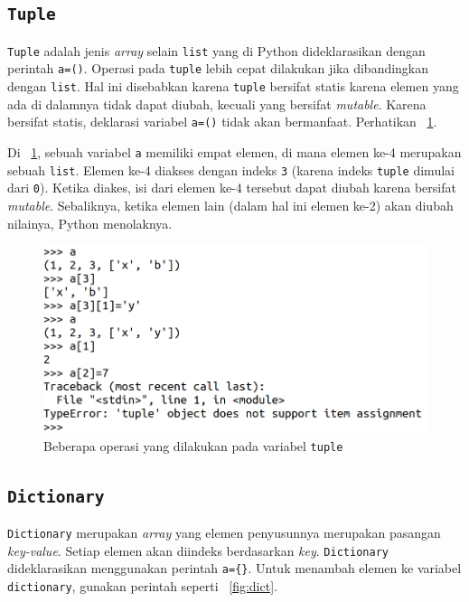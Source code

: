 \subsection{\texttt{Tuple}}
\texttt{Tuple} adalah jenis \textit{array} selain \texttt{list} yang di Python dideklarasikan dengan perintah \texttt{a=()}. Operasi pada \texttt{tuple} lebih cepat dilakukan jika dibandingkan dengan \texttt{list}. Hal ini disebabkan karena \texttt{tuple} bersifat statis karena elemen yang ada di dalamnya tidak dapat diubah, kecuali yang bersifat \textit{mutable}. Karena bersifat statis, deklarasi variabel \texttt{a=()} tidak akan bermanfaat. Perhatikan \figurename~\ref{fig:tuple}.

Di \figurename~\ref{fig:tuple}, sebuah variabel \texttt{a} memiliki empat elemen, di mana elemen ke-4 merupakan sebuah \texttt{list}. Elemen ke-4 diakses dengan indeks \texttt{3} (karena indeks \texttt{tuple} dimulai dari \texttt{0}). Ketika diakes, isi dari elemen ke-4 tersebut dapat diubah karena bersifat \textit{mutable}. Sebaliknya, ketika elemen lain (dalam hal ini elemen ke-2) akan diubah nilainya, Python menolaknya. 

\begin{figure}[h!]
  \begin{center}
    \includegraphics{pics/tuple.png}
    \caption{Beberapa operasi yang dilakukan pada variabel \texttt{tuple}}
    \label{fig:tuple}
  \end{center}
\end{figure}
 
\subsection{\texttt{Dictionary}}
\texttt{Dictionary} merupakan \textit{array} yang elemen penyusunnya merupakan pasangan \textit{key-value}. Setiap elemen akan diindeks berdasarkan \textit{key}. \texttt{Dictionary} dideklarasikan menggunakan perintah \texttt{a=\{\}}. Untuk menambah elemen ke variabel \texttt{dictionary}, gunakan perintah seperti \figurename~\ref{fig:dict}.

